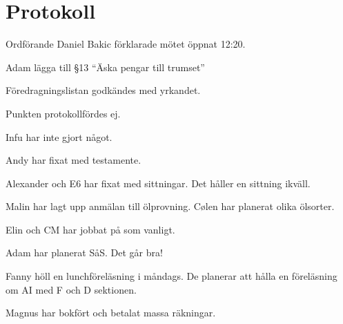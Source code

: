\documentclass[10pt]{article}
\def\mo{Daniel Bakic}
\begin{document}
\section*{Protokoll}
\begin{paragrafer}
	Ordförande {\mo} förklarade mötet öppnat 12:20.

	{\valavmo}

	{\valavms}

	{\valavj}

	{\tosg}

	{\ingaadj}

	
	Adam \ypa lägga till \S13 ``Äska pengar till trumset''
	
	Föredragningslistan godkändes med yrkandet.

	\ingaprot

	\begin{fyllnadsval} %
	\end{fyllnadsval}

	\begin{paragrafer}
		Punkten protokollfördes ej.


		Infu har inte gjort något.

		Andy har fixat med testamente.

		Alexander och E6 har fixat med sittningar. Det håller en sittning ikväll.

		Malin har lagt upp anmälan till ölprovning. Cølen har planerat olika ölsorter.

		Elin och CM har jobbat på som vanligt.

		Adam har planerat SåS. Det går bra!

		Fanny höll en lunchföreläsning i måndags. De planerar att hålla en föreläsning om AI med F och D sektionen.

		Magnus har bokfört och betalat massa räkningar.


\end{paragrafer}
\end{paragrafer}
\end{document}
